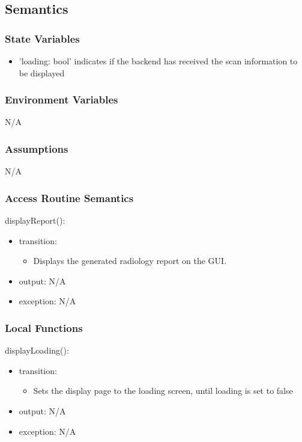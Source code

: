 \documentclass[12pt, titlepage]{article}
\begin{document}
\subsection{Semantics}

\subsubsection{State Variables}
\begin{itemize}
    \item 'loading: bool' indicates if the backend has received the scan information to be displayed
\end{itemize}
\subsubsection{Environment Variables}
N/A
\subsubsection{Assumptions}
N/A
\subsubsection{Access Routine Semantics}

\noindent displayReport():
\begin{itemize}
\item transition: \begin{itemize}
    \item Displays the generated radiology report on the GUI.
\end{itemize}
\item output: N/A
\item exception: N/A
\end{itemize}

\subsubsection{Local Functions}
\noindent displayLoading():
\begin{itemize}
\item transition: \begin{itemize}
    \item Sets the display page to the loading screen, until loading is set to false
\end{itemize}
\item output: N/A
\item exception: N/A
\end{itemize}
\newpage
\end{document}
